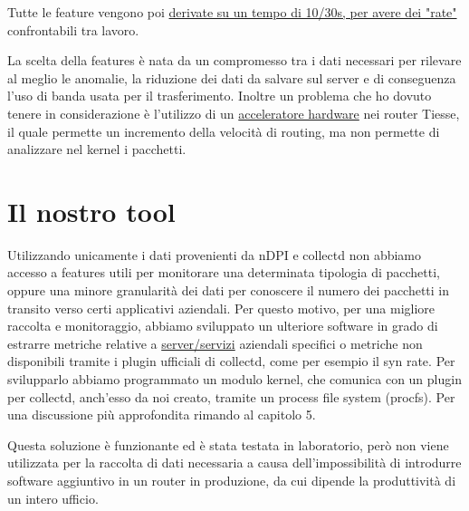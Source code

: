 Tutte le feature vengono poi \uline{derivate su un tempo di 10/30s, per avere dei "rate"} confrontabili tra lavoro.

La scelta della features è nata da un compromesso tra i dati necessari per rilevare al meglio le anomalie, la riduzione dei dati da salvare sul server e di conseguenza l'uso di banda usata per il trasferimento. Inoltre un problema che ho dovuto tenere in considerazione è l'utilizzo di un \underline{acceleratore hardware} nei router Tiesse, il quale permette un incremento della velocità di routing, ma non permette di analizzare nel kernel i pacchetti.
 
\section{Il nostro tool}

Utilizzando unicamente i dati provenienti da nDPI e collectd non abbiamo accesso a features utili per monitorare una determinata tipologia di pacchetti, oppure una minore granularità dei dati per conoscere il numero dei pacchetti in transito verso certi applicativi aziendali. Per questo motivo, per una migliore raccolta e monitoraggio, abbiamo sviluppato un ulteriore software in grado di estrarre metriche relative a \uline{server/servizi} aziendali specifici o metriche non disponibili tramite i plugin ufficiali di collectd, come per esempio il syn rate. Per svilupparlo abbiamo programmato un modulo kernel, che comunica con un plugin per collectd, anch'esso da noi creato, tramite un process file system (procfs). Per una discussione più approfondita rimando al capitolo 5.

Questa soluzione è funzionante ed è stata testata in laboratorio, però non viene utilizzata per la raccolta di dati necessaria a causa dell'impossibilità di introdurre software aggiuntivo in un router in produzione, da cui dipende la produttività di un intero ufficio. 
 
 
